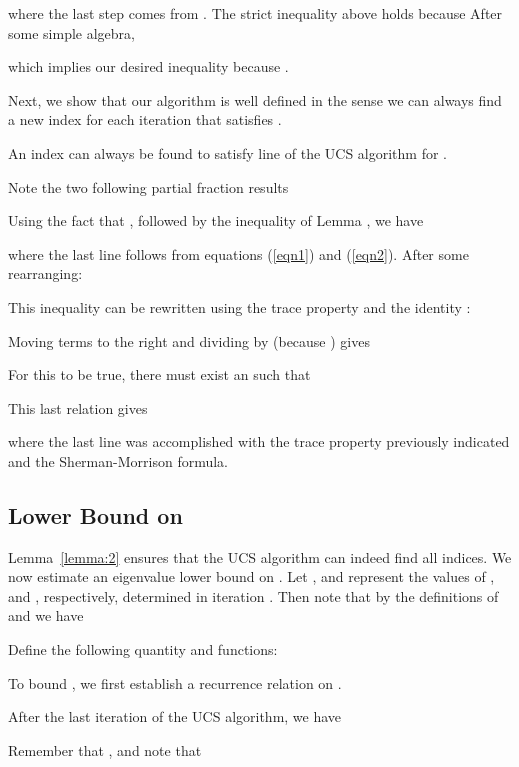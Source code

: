 \documentclass[final,leqno,onefignum,onetabnum]{siamltex1213}
\begin{document}
where the last step comes from 
. The strict inequality above holds
because  After some simple algebra,
\small

\normalsize
which implies our desired inequality because .
\hspace{2 em}\endproof

Next, we show that our algorithm is well defined in the sense we can always find a new index  for each iteration that
satisfies .
\begin{lemma}\label{lemma:2}
An index  can always be found to satisfy line
 of the UCS algorithm for .
\end{lemma}
\proof Note the two following partial fraction results


Using the fact that , followed by the inequality of Lemma , we have
\footnotesize
 	
\normalsize
where the last line follows from equations (\ref{eqn1}) and (\ref{eqn2}).  After some rearranging:


This inequality can be rewritten using the trace property  and the identity :
\footnotesize

\normalsize
Moving terms to the right and dividing by  (because )  gives

For this to be true, there must exist an  such that

This last relation gives

where the last line was accomplished with the trace property previously indicated and the Sherman-Morrison formula.
\hspace{2 em}\endproof

\subsection{Lower Bound on }\label{sec:32}

Lemma~\ref{lemma:2} ensures that the UCS algorithm can
indeed find all  indices. We now estimate an eigenvalue lower
bound on . Let , 
and  represent the values of ,
 and , respectively, determined in
iteration .  Then note that by the definitions of  and
 we have

Define the following quantity and functions:

To bound , we first establish a recurrence relation on . 
\begin{lemma} \label{lem:tech}
After the last iteration of the UCS algorithm, we have

\end{lemma}
\proof
Remember that , and note that 
\end{document}
